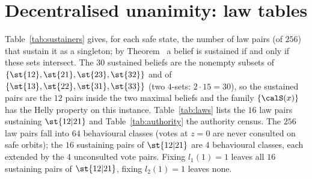 \section{Decentralised unanimity: law tables}\label{si:dec}

Table~\ref{tab:sustainers} gives, for each safe state, the number of law pairs (of $256$) that sustain it as a singleton; by Theorem~ a belief is sustained if and only if these sets intersect. The $30$ sustained beliefs are the nonempty subsets of $\{\st{12},\st{21},\st{23},\st{32}\}$ and of $\{\st{13},\st{22},\st{31},\st{33}\}$ (two $4$-sets: $2\cdot 15=30$), so the sustained pairs are the $12$ pairs inside the two maximal beliefs and the family $\{\calS(x)\}$ has the Helly property on this instance. Table~\ref{tab:laws} lists the $16$ law pairs sustaining $\st{12|21}$ and Table~\ref{tab:authority} the authority census. The $256$ law pairs fall into $64$ behavioural classes (votes at $z=0$ are never consulted on safe orbits); the $16$ sustaining pairs of $\st{12|21}$ are $4$ behavioural classes, each extended by the $4$ unconsulted vote pairs. Fixing $l_1(1)=1$ leaves all $16$ sustaining pairs of $\st{12|21}$, fixing $l_2(1)=1$ leaves none.




